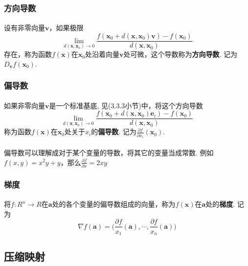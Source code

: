 \subsubsection{方向导数}
\paragraph{}
设有非零向量$\textbf{v}$，如果极限
$$
\lim_{d(\textbf{x}, \textbf{x}_0) \to 0} \frac{f(\textbf{x}_0 + d(\textbf{x}, \textbf{x}_0) \textbf{v}) - f(\textbf{x}_0)}{d(\textbf{x}, \textbf{x}_0)}
$$
存在，称为函数$f(\textbf{x})$在$\textbf{x}_0$处沿着向量$\textbf{v}$处可微，这个导数称为\textbf{方向导数}. 记为$D_{\textbf{v}} f(\textbf{x}_0)$.

\subsubsection{偏导数}
\paragraph{}
如果非零向量$\textbf{v}$是一个标准基底, 见(3.3.3小节)中，将这个方向导数
$$
\lim_{d(\textbf{x}, \textbf{x}_0) \to 0} \frac{f(\textbf{x}_0 + d(\textbf{x}, \textbf{x}_0) \textbf{e}_i) - f(\textbf{x}_0)}{d(\textbf{x}, \textbf{x}_0)}
$$
称为函数$f(\textbf{x})$在$\textbf{x}_0$处关于$x_i$的\textbf{偏导数}. 记为$\frac{\partial f}{\partial x_i} (\textbf{x}_0)$.

\paragraph{}
偏导数可以理解成对于某个变量的导数，将其它的变量当成常数. 例如$f(x, y) = x^2 y + y$，那么$\frac{\partial f}{\partial x} = 2xy$

\subsubsection{梯度}
\paragraph{}
将$f: R^n \to R$在$\textbf{a}$处的各个变量的偏导数组成的向量，称为$f(\textbf{x})$在$\textbf{a}$处的\textbf{梯度}. 记为
$$
\nabla f(\textbf{a}) = \big( \frac{\partial f}{x_1}(\textbf{a}), \cdots, \frac{\partial f}{x_n}(\textbf{a}) \big)
$$

\subsection{压缩映射}
